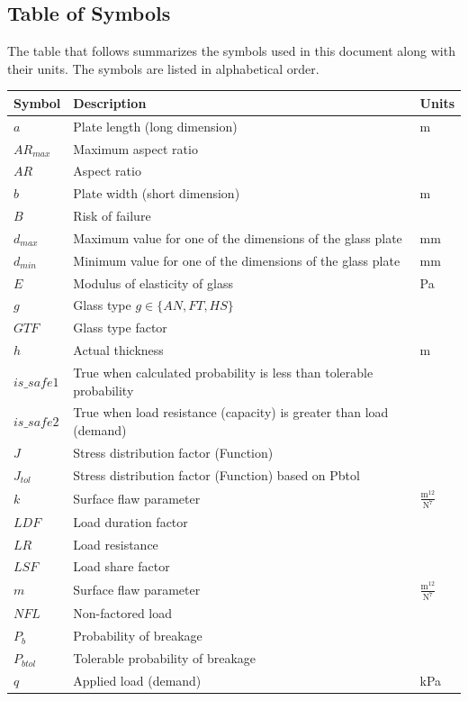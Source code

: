 \documentclass[12pt]{article}
\begin{document}
\subsection{Table of Symbols}
\label{Sec:ToS}
The table that follows summarizes the symbols used in this document along with their units. The symbols are listed in alphabetical order.
\begin{longtabu}{l X[l] l}
\toprule
Symbol & Description & Units
\\
\midrule
$a$ & Plate length (long dimension) & m
\\
${AR_{max}}$ & Maximum aspect ratio & 
\\
$AR$ & Aspect ratio & 
\\
$b$ & Plate width (short dimension) & m
\\
$B$ & Risk of failure & 
\\
${d_{max}}$ & Maximum value for one of the dimensions of the glass plate & mm
\\
${d_{min}}$ & Minimum value for one of the dimensions of the glass plate & mm
\\
$E$ & Modulus of elasticity of glass & Pa
\\
$g$ & Glass type $g\in{}\{AN,FT,HS\}$ & 
\\
$GTF$ & Glass type factor & 
\\
$h$ & Actual thickness & m
\\
$is\_safe1$ & True when calculated probability is less than tolerable probability & 
\\
$is\_safe2$ & True when load resistance (capacity) is greater than load (demand) & 
\\
$J$ & Stress distribution factor (Function) & 
\\
${J_{tol}}$ & Stress distribution factor (Function) based on Pbtol & 
\\
$k$ & Surface flaw parameter & $\frac{\text{m}^{12}}{\text{N}^{7}}$
\\
$LDF$ & Load duration factor & 
\\
$LR$ & Load resistance & 
\\
$LSF$ & Load share factor & 
\\
$m$ & Surface flaw parameter & $\frac{\text{m}^{12}}{\text{N}^{7}}$
\\
$NFL$ & Non-factored load & 
\\
${P_{b}}$ & Probability of breakage & 
\\
${P_{btol}}$ & Tolerable probability of breakage & 
\\
$q$ & Applied load (demand) & kPa

\end{longtabu}
\end{document}
